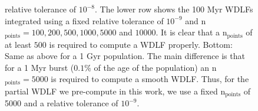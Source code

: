 \documentclass[fleqn,usenatbib]{mnras}
\begin{document}
\begin{figure}
{    relative tolerance of $10^{-8}$. The lower row shows the 100 Myr WDLFs
    integrated using a fixed relative tolerance of $10^{-9}$ and
    n$_{\mathrm{points}} = 100, 200, 500, 1000, 5000$ and $10000$. It is clear
    that a n$_{\mathrm{points}}$ of at least $500$ is required to compute a
    WDLF properly. Bottom: Same as above for a 1 Gyr population. The main
    difference is that for a 1 Myr burst ($0.1\%$ of the age of the population)
    an n$_{\mathrm{points}}=5000$ is required to compute a smooth WDLF. Thus,
    for the partial WDLF we pre-compute in this work, we use a fixed
    n$_{\mathrm{points}}$ of 5000 and a relative tolerance of $10^{-9}$.}
    \label{fig:integration-precision}
\end{figure}

\bsp	%
\label{lastpage}
\end{document}
